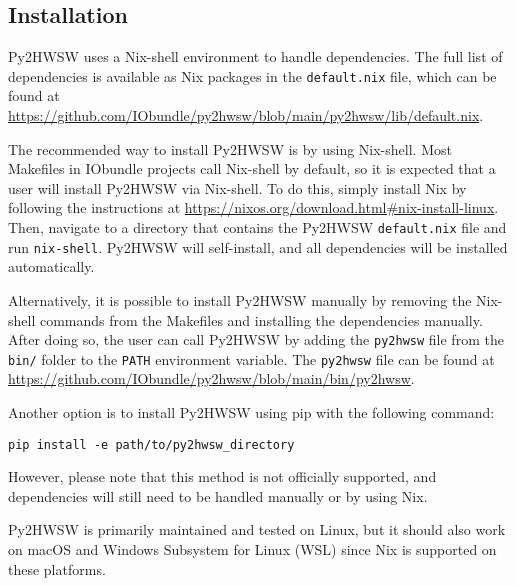 %

\subsection{Installation}

Py2HWSW uses a Nix-shell environment to handle dependencies. The full list of dependencies is available as Nix packages in the \texttt{default.nix} file, which can be found at \url{https://github.com/IObundle/py2hwsw/blob/main/py2hwsw/lib/default.nix}.

The recommended way to install Py2HWSW is by using Nix-shell. Most Makefiles in IObundle projects call Nix-shell by default, so it is expected that a user will install Py2HWSW via Nix-shell. To do this, simply install Nix by following the instructions at \url{https://nixos.org/download.html#nix-install-linux}. Then, navigate to a directory that contains the Py2HWSW \texttt{default.nix} file and run \texttt{nix-shell}. Py2HWSW will self-install, and all dependencies will be installed automatically.

Alternatively, it is possible to install Py2HWSW manually by removing the Nix-shell commands from the Makefiles and installing the dependencies manually. After doing so, the user can call Py2HWSW by adding the \texttt{py2hwsw} file from the \texttt{bin/} folder to the \texttt{PATH} environment variable. The \texttt{py2hwsw} file can be found at \url{https://github.com/IObundle/py2hwsw/blob/main/bin/py2hwsw}.

Another option is to install Py2HWSW using pip with the following command:
\begin{verbatim}
pip install -e path/to/py2hwsw_directory
\end{verbatim}
However, please note that this method is not officially supported, and dependencies will still need to be handled manually or by using Nix.

Py2HWSW is primarily maintained and tested on Linux, but it should also work on macOS and Windows Subsystem for Linux (WSL) since Nix is supported on these platforms.
